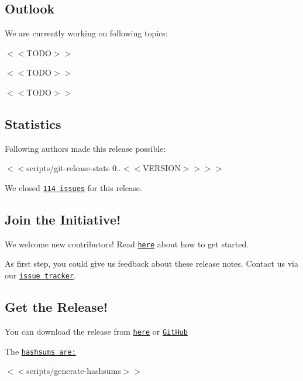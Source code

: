 \subsection*{Outlook}

We are currently working on following topics\+:


\begin{DoxyItemize}
\item $<$$<$\+T\+O\+D\+O$>$$>$
\item $<$$<$\+T\+O\+D\+O$>$$>$
\item $<$$<$\+T\+O\+D\+O$>$$>$
\end{DoxyItemize}

\subsection*{Statistics}

Following authors made this release possible\+:

$<$$<${\ttfamily scripts/git-\/release-\/stats 0..$<$$<$V\+E\+R\+S\+I\+ON$>$$>$}$>$$>$

We closed \href{https://github.com/ElektraInitiative/libelektra/milestone/20?closed=1}{\tt 114 issues} for this release.

\subsection*{Join the Initiative!}

We welcome new contributors! Read \href{https://www.libelektra.org/devgettingstarted/ideas}{\tt here} about how to get started.

As first step, you could give us feedback about these release notes. Contact us via our \href{https://issues.libelektra.org}{\tt issue tracker}.

\subsection*{Get the Release!}

You can download the release from \href{https://www.libelektra.org/ftp/elektra/releases/elektra-0.8.<<VERSION>>.tar.gz}{\tt here} or \href{https://github.com/ElektraInitiative/ftp/blob/master/releases/elektra-0.8.<<VERSION>>.tar.gz?raw=true}{\tt Git\+Hub}

The \href{https://github.com/ElektraInitiative/ftp/blob/master/releases/elektra-0.8.<<VERSION>>.tar.gz.hashsum?raw=true}{\tt hashsums are\+:}

$<$$<${\ttfamily scripts/generate-\/hashsums}$>$$>$


